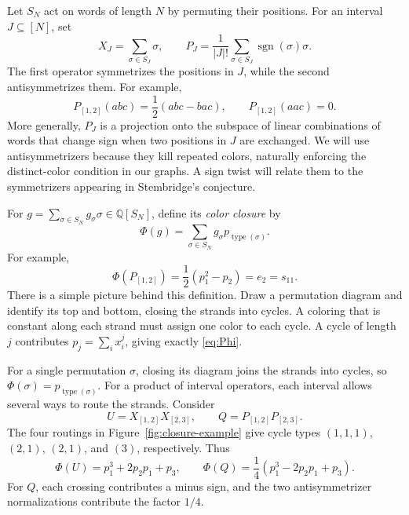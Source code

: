 \documentclass[11pt]{article}
\theoremstyle{definition}
\theoremstyle{remark}
\newcommand{\sgn}{\operatorname{sgn}}
\newcommand{\type}{\operatorname{type}}
\begin{document}
Let $S_N$ act on words of length $N$ by permuting
their positions. For an interval $J\subseteq[N]$, set
\[
X_J=\sum_{\sigma\in S_J}\sigma,\qquad
P_J=\frac{1}{|J|!}\sum_{\sigma\in S_J}
\sgn(\sigma)\sigma.
\]
The first operator symmetrizes the positions in $J$,
while the second antisymmetrizes them. For example,
\[
P_{[1,2]}(abc)=\frac12(abc-bac),\qquad
P_{[1,2]}(aac)=0.
\]
More generally, $P_J$ is a projection onto the
subspace of linear combinations of words that change
sign when two positions in $J$ are exchanged.
We will use antisymmetrizers because they kill
repeated colors, naturally enforcing the distinct-color
condition in our graphs. A sign twist will relate
them to the symmetrizers appearing in Stembridge's
conjecture.

For $g=\sum_{\sigma\in S_N}g_\sigma\sigma
\in\mathbb Q[S_N]$, define its \emph{color closure} by
\begin{equation}\label{eq:Phi}
\Phi(g)=\sum_{\sigma\in S_N}
g_\sigma p_{\type(\sigma)}.
\end{equation}
For example,
\[
\Phi(P_{[1,2]})
=\frac12(p_1^2-p_2)=e_2=s_{11}.
\]
There is a simple picture behind this definition.
Draw a permutation diagram and identify its top
and bottom, closing the strands into cycles.
A coloring that is constant along each strand
must assign one color to each cycle. A cycle of
length $j$ contributes $p_j=\sum_i x_i^j$,
giving exactly \eqref{eq:Phi}.


For a single permutation $\sigma$, closing its diagram
joins the strands into cycles, so
$\Phi(\sigma)=p_{\type(\sigma)}$.
For a product of interval operators, each interval
allows several ways to route the strands. Consider
\[
U=X_{[1,2]}X_{[2,3]},\qquad
Q=P_{[1,2]}P_{[2,3]}.
\]
The four routings in Figure~\ref{fig:closure-example}
give cycle types $(1,1,1)$, $(2,1)$, $(2,1)$,
and $(3)$, respectively. Thus
\[
\Phi(U)=p_1^3+2p_2p_1+p_3,\qquad
\Phi(Q)=\frac14(p_1^3-2p_2p_1+p_3).
\]
For $Q$, each crossing contributes a minus sign,
and the two antisymmetrizer normalizations contribute
the factor $1/4$.
\end{document}
